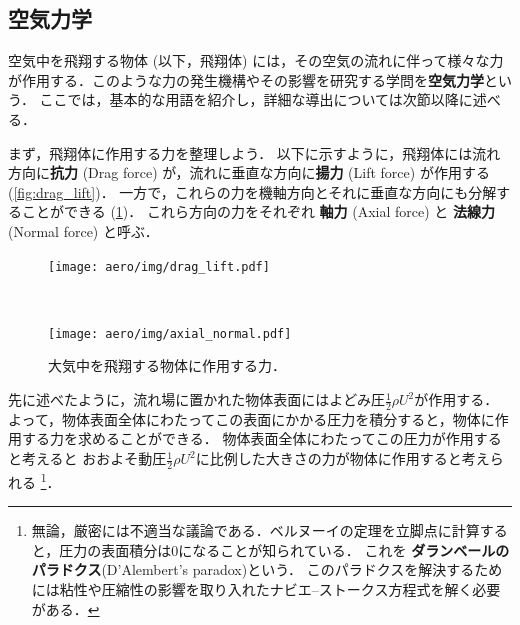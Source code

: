 \documentclass[uplatex,dvipdfmx,a4j,11pt]{jsreport}
\newcommand{\keyword}[1]{\textcolor{mainblue}{\textbf{#1}}}
\numberwithin{equation}{chapter}
\begin{document}
\subsection{空気力学}
空気中を飛翔する物体 (以下，飛翔体) には，その空気の流れに伴って様々な力が作用する．このような力の発生機構やその影響を研究する学問を\keyword{空気力学}という．
ここでは，基本的な用語を紹介し，詳細な導出については次節以降に述べる．

\enskip

まず，飛翔体に作用する力を整理しよう．
以下に示すように，飛翔体には流れ方向に\keyword{抗力} (Drag force) が，流れに垂直な方向に\keyword{揚力} (Lift force) が作用する (\cref{fig:drag_lift})．
一方で，これらの力を機軸方向とそれに垂直な方向にも分解することができる (\cref{fig:axial_normal})．
これら方向の力をそれぞれ \keyword{軸力} (Axial force) と \keyword{法線力} (Normal force) と呼ぶ．

\begin{figure}[H]
  \centering
  \begin{minipage}{\hsize}
    \centering
    \texttt{[image: aero/img/drag\_lift.pdf]}
    \label{fig:drag_lift}
  \end{minipage}\\
  \begin{minipage}{\hsize}
    \centering
    \texttt{[image: aero/img/axial\_normal.pdf]}
    \label{fig:axial_normal}
  \end{minipage}
  \caption{大気中を飛翔する物体に作用する力．}
\end{figure}


先に述べたように，流れ場に置かれた物体表面にはよどみ圧$\frac{1}{2}\rho U^{2}$が作用する．
よって，物体表面全体にわたってこの表面にかかる圧力を積分すると，物体に作用する力を求めることができる．
物体表面全体にわたってこの圧力が作用すると考えると
おおよそ動圧$\frac{1}{2}\rho U^{2}$に比例した大きさの力が物体に作用すると考えられる
\footnote{
  無論，厳密には不適当な議論である．ベルヌーイの定理を立脚点に計算すると，圧力の表面積分は0になることが知られている．
  これを \keyword{ダランベールのパラドクス}(D'Alembert's paradox)という．
  このパラドクスを解決するためには粘性や圧縮性の影響を取り入れたナビエ--ストークス方程式を解く必要がある．
}．
\end{document}
